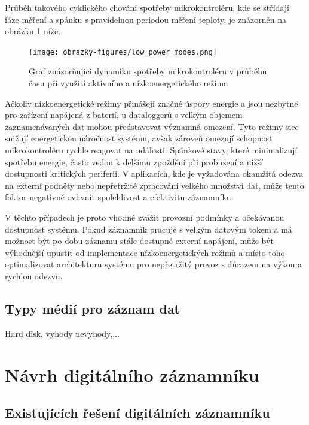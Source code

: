 Průběh takového cyklického chování spotřeby mikrokontroléru, kde se střídají fáze měření a spánku s pravidelnou periodou měření teploty, je znázorněn na obrázku \ref{fig:low-power-modes} níže.

\begin{figure}[h]
    \centering
    \texttt{[image: obrazky-figures/low\_power\_modes.png]}
    
    \caption{Graf znázorňujíci dynamiku spotřeby mikrokontroléru v průběhu času při využití aktivního a nízkoenergetického režimu}
    \label{fig:low-power-modes}
\end{figure}

Ačkoliv nízkoenergetické režimy přinášejí značné úspory energie a jsou nezbytné pro zařízení napájená z baterií, u dataloggerů s velkým objemem zaznamenávaných dat mohou představovat 
významná omezení. Tyto režimy sice snižují energetickou náročnost systému, avšak zároveň omezují schopnost mikrokontroléru rychle reagovat na události. Spánkové stavy, které minimalizují 
spotřebu energie, často vedou k delšímu zpoždění při probuzení a nižší dostupnosti kritických periferií. V aplikacích, kde je vyžadována okamžitá odezva na externí podněty nebo nepřetržité 
zpracování velkého množství dat, může tento faktor negativně ovlivnit spolehlivost a efektivitu záznamníku. \cite{embedded_low_power_modes}

V těchto případech je proto vhodné zvážit provozní podmínky a očekávanou dostupnost systému. Pokud záznamník pracuje s velkým datovým tokem a má možnost být po dobu záznamu stále dostupné 
externí napájení, může být výhodnější upustit od implementace nízkoenergetických režimů a místo toho optimalizovat architekturu systému pro nepřetržitý provoz s důrazem na výkon a rychlou 
odezvu. \cite{analog_devices_low_power_modes}

\section{Typy médií pro záznam dat}
Hard disk, vyhody nevyhody,... 

\chapter{Návrh digitálního záznamníku}

\section{Existujících řešení digitálních záznamníku}

